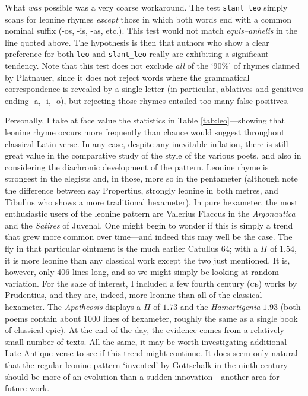 \documentclass[twocolumn, switch]{article} %
\begin{document}
What \emph{was} possible was a very coarse workaround. The test
\texttt{slant\_leo} simply scans for leonine rhymes \emph{except} those in
which both words end with a common nominal suffix (-os, -is, -as, etc.). This
test would not match \emph{equis--anhelis} in the line quoted above. The
hypothesis is then that authors who show a clear preference for both
\texttt{leo} and \texttt{slant\_leo} really are exhibiting a significant
tendency. Note that this test does not exclude \emph{all} of the `90\%' of
rhymes claimed by Platnauer, since it does not reject words where the
grammatical correspondence is revealed by a single letter (in particular,
ablatives and genitives ending -a, -i, -o), but rejecting those rhymes
entailed too many false positives.

Personally, I take at face value the statistics in Table
\ref{tab:leo}---showing that leonine rhyme occurs more frequently than chance
would suggest throughout classical Latin verse. In any case, despite any
inevitable inflation, there is still great value in the comparative study of
the style of the various poets, and also in considering the diachronic
development of the pattern. Leonine rhyme is strongest in the elegists and, in
those, more so in the pentameter (although note the difference between say
Propertius, strongly leonine in both metres, and Tibullus who shows a more
traditional hexameter). In pure hexameter, the most enthusiastic users of the
leonine pattern are Valerius Flaccus in the \emph{Argonautica} and the
\emph{Satires} of Juvenal. One might begin to wonder if this is simply a trend
that grew more common over time---and indeed this may well be the case. The
fly in that particular ointment is the much earlier Catullus 64; with a $\Pi$
of $1.54$, it is more leonine than any classical work except the two just
mentioned. It is, however, only 406 lines long, and so we might simply be
looking at random variation. For the sake of interest, I included a few fourth
century (\textsc{ce}) works by Prudentius, and they are, indeed, more leonine
than all of the classical hexameter. The \emph{Apotheosis} displays a $\Pi$ of
$1.73$ and the \emph{Hamartigenia} $1.93$ (both poems contain about 1000 lines
of hexameter, roughly the same as a single book of classical epic). At the end
of the day, the evidence comes from a relatively small number of texts. All
the same, it may be worth investigating additional Late Antique verse to see
if this trend might continue. It does seem only natural that the regular
leonine pattern `invented' by Gottschalk in the ninth century should be more
of an evolution than a sudden innovation---another area for future work.
\end{document}
